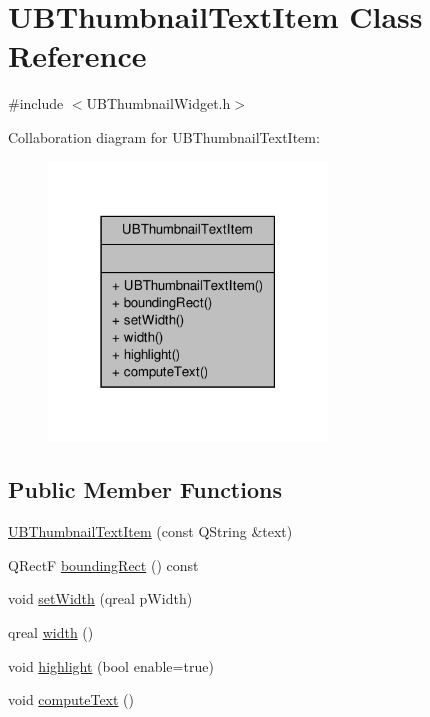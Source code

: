 \hypertarget{class_u_b_thumbnail_text_item}{\section{U\-B\-Thumbnail\-Text\-Item Class Reference}
\label{d0/d82/class_u_b_thumbnail_text_item}
}


{\ttfamily \#include $<$U\-B\-Thumbnail\-Widget.\-h$>$}



Collaboration diagram for U\-B\-Thumbnail\-Text\-Item\-:
\nopagebreak
\begin{figure}[H]
\begin{center}
\leavevmode
\includegraphics[width=210pt]{d6/dc0/class_u_b_thumbnail_text_item__coll__graph}
\end{center}
\end{figure}
\subsection*{Public Member Functions}
\begin{DoxyCompactItemize}
\item 
\hyperlink{class_u_b_thumbnail_text_item_aa431b21e175c8d2fda6d74e05f18eefd}{U\-B\-Thumbnail\-Text\-Item} (const Q\-String \&text)
\item 
Q\-Rect\-F \hyperlink{class_u_b_thumbnail_text_item_a3337d897e04fae1c84af0164b9803679}{bounding\-Rect} () const 
\item 
void \hyperlink{class_u_b_thumbnail_text_item_a4612ee1a3ce50b01ae40c4354c5b78f7}{set\-Width} (qreal p\-Width)
\item 
qreal \hyperlink{class_u_b_thumbnail_text_item_a295e0334c3a61fd14efb785a611e76bb}{width} ()
\item 
void \hyperlink{class_u_b_thumbnail_text_item_ac74d81b775c7eaa117bb610af2ed6afc}{highlight} (bool enable=true)
\item 
void \hyperlink{class_u_b_thumbnail_text_item_a6c7bd56033a9597bad9acb56e829b4f6}{compute\-Text} ()
\end{DoxyCompactItemize}


